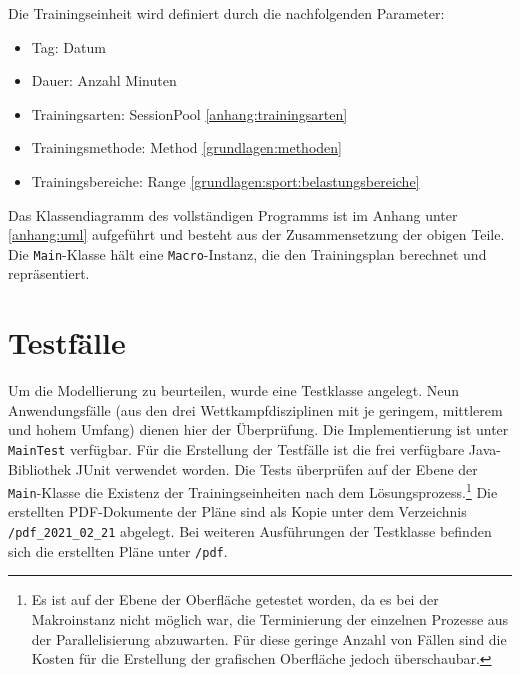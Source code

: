 Die Trainingseinheit wird definiert durch die nachfolgenden Parameter:
\begin{itemize}[topsep=0pt, parsep=0pt]
    \item Tag: Datum
    \item Dauer: Anzahl Minuten
    \item Trainingsarten: SessionPool \ref{anhang:trainingsarten}
    \item Trainingsmethode: Method \ref{grundlagen:methoden}
    \item Trainingsbereiche: Range \ref{grundlagen:sport:belastungsbereiche}
\end{itemize}
Das Klassendiagramm des vollständigen Programms ist im Anhang unter \ref{anhang:uml} aufgeführt und besteht aus der Zusammensetzung der obigen Teile. Die \texttt{Main}-Klasse hält eine \texttt{Macro}-Instanz, die den Trainingsplan berechnet und repräsentiert.

\section{Testfälle}
Um die Modellierung zu beurteilen, wurde eine Testklasse angelegt. Neun Anwendungsfälle (aus den drei Wettkampfdisziplinen mit je geringem, mittlerem und hohem Umfang) dienen hier der Überprüfung. Die Implementierung ist unter \texttt{MainTest} verfügbar. 
Für die Erstellung der Testfälle ist die frei verfügbare Java-Bibliothek JUnit verwendet worden. Die Tests überprüfen auf der Ebene der \texttt{Main}-Klasse die Existenz der Trainingseinheiten nach dem Lösungsprozess.\footnote{Es ist auf der Ebene der Oberfläche getestet worden, da es bei der Makroinstanz nicht möglich war, die Terminierung der einzelnen Prozesse aus der Parallelisierung abzuwarten. Für diese geringe Anzahl von Fällen sind die Kosten für die Erstellung der grafischen Oberfläche jedoch überschaubar.} 
Die erstellten PDF-Dokumente der Pläne sind als Kopie unter dem Verzeichnis \texttt{/pdf\_2021\_02\_21} abgelegt. Bei weiteren Ausführungen der Testklasse befinden sich die erstellten Pläne unter \texttt{/pdf}.
